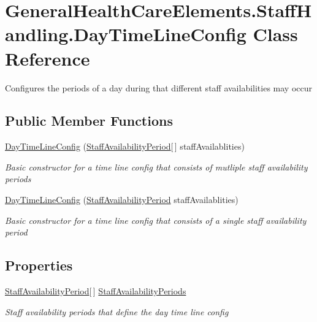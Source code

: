 \hypertarget{class_general_health_care_elements_1_1_staff_handling_1_1_day_time_line_config}{}\section{General\+Health\+Care\+Elements.\+Staff\+Handling.\+Day\+Time\+Line\+Config Class Reference}
\label{class_general_health_care_elements_1_1_staff_handling_1_1_day_time_line_config}


Configures the periods of a day during that different staff availabilities may occur  


\subsection*{Public Member Functions}
\begin{DoxyCompactItemize}
\item 
\hyperlink{class_general_health_care_elements_1_1_staff_handling_1_1_day_time_line_config_aeb9f4cacaa7f7220e7b8a235aab2006e}{Day\+Time\+Line\+Config} (\hyperlink{class_general_health_care_elements_1_1_staff_handling_1_1_staff_availability_period}{Staff\+Availability\+Period}\mbox{[}$\,$\mbox{]} staff\+Availablities)
\begin{DoxyCompactList}\small\item\em Basic constructor for a time line config that consists of mutliple staff availability periods \end{DoxyCompactList}\item 
\hyperlink{class_general_health_care_elements_1_1_staff_handling_1_1_day_time_line_config_aba716c15fa6690786b8442836e13755b}{Day\+Time\+Line\+Config} (\hyperlink{class_general_health_care_elements_1_1_staff_handling_1_1_staff_availability_period}{Staff\+Availability\+Period} staff\+Availablities)
\begin{DoxyCompactList}\small\item\em Basic constructor for a time line config that consists of a single staff availability period \end{DoxyCompactList}\end{DoxyCompactItemize}
\subsection*{Properties}
\begin{DoxyCompactItemize}
\item 
\hyperlink{class_general_health_care_elements_1_1_staff_handling_1_1_staff_availability_period}{Staff\+Availability\+Period}\mbox{[}$\,$\mbox{]} \hyperlink{class_general_health_care_elements_1_1_staff_handling_1_1_day_time_line_config_af2745ebb9e1b89c086be4cf717c1c3d5}{Staff\+Availability\+Periods}
\begin{DoxyCompactList}\small\item\em Staff availability periods that define the day time line config \end{DoxyCompactList}\end{DoxyCompactItemize}


